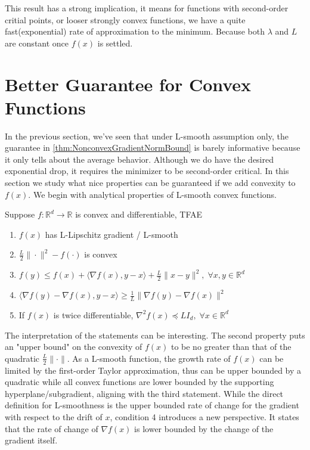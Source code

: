 This result has a strong implication, it means for functions with second-order critial points, or looser strongly convex functions, we have a quite fast(exponential) rate of approximation to the minimum. Because both $\lambda$ and $L$ are constant once $f(x)$ is settled.

\section{Better Guarantee for Convex Functions}
In the previous section, we've seen that under L-smooth assumption only, the guarantee in \ref{thm:NonconvexGradientNormBound} is barely informative because it only tells about the average behavior. Although we do have the desired exponential drop, it requires the minimizer to be second-order critical. In this section we study what nice properties can be guaranteed if we add convexity to $f(x)$. We begin with analytical properties of L-smooth convex functions.

\begin{lemma}\label{lemma:CharactrizationOfLSmoothConvex}
    Suppose $f : \mathbb{R}^d \rightarrow \mathbb{R}$ is convex and differentiable, TFAE
    \begin{enumerate}
        \item $f(x)$ has L-Lipschitz gradient / L-smooth 
        \item $\frac{L}{2}\| \cdot \|^2 - f(\cdot)$ is convex
        \item $f(y) \leq f(x) + \langle \nabla f(x), y-x \rangle + \frac{L}{2}\|x-y\|^2,\; \forall x,y \in \mathbb{R}^d$
        \item $\langle \nabla f(y) - \nabla f(x), y-x \rangle \geq \frac{1}{L}\|\nabla f(y) - \nabla f(x) \|^2 $ 
        \item If $f(x)$ is twice differentiable, $\nabla^2 f(x) \preceq L I_d, \;\forall x \in \mathbb{R}^d$ 
    \end{enumerate}
\end{lemma}

\begin{remark}
    The interpretation of the statements can be interesting. The second property puts an "upper bound" on the convexity of $f(x)$ to be no greater than that of the quadratic $\frac{L}{2} \| \cdot \|$. As a L-smooth function, the growth rate of $f(x)$ can be limited by the first-order Taylor approximation, thus can be upper bounded by a quadratic while all convex functions are lower bounded by the supporting hyperplane/subgradient, aligning with the third statement. While the direct definition for L-smoothness is the upper bounded rate of change for the gradient with respect to the drift of $x$, condition 4 introduces a new perspective. It states that the rate of change of $\nabla f(x)$ is lower bounded by the change of the gradient itself. 
\end{remark}

